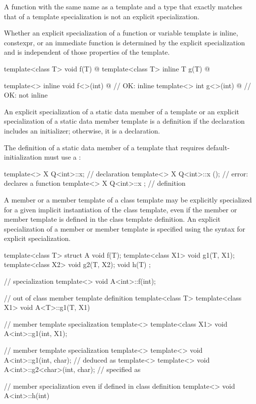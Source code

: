 \pnum
A function with the same name as a template and a type that exactly matches that
of a template specialization is not an explicit specialization.

\pnum
Whether an explicit specialization of a function or variable template
is inline, constexpr, or an immediate function
is determined by the explicit specialization and
is independent of those properties of the template.
\begin{example}
\begin{codeblock}
template<class T> void f(T) { @\commentellip@ }
template<class T> inline T g(T) { @\commentellip@ }

template<> inline void f<>(int) { @\commentellip@ }   // OK: inline
template<> int g<>(int) { @\commentellip@ }           // OK: not inline
\end{codeblock}
\end{example}

\pnum
An explicit specialization of a static data member of a template
or an explicit specialization of a static data member template is a
definition if the declaration includes an initializer;
otherwise, it is a declaration.
\begin{note}
The definition of a static data member of a template
that requires default-initialization must use a :

\begin{codeblock}
template<> X Q<int>::x;                         // declaration
template<> X Q<int>::x ();                      // error: declares a function
template<> X Q<int>::x { };                     // definition
\end{codeblock}
\end{note}

\pnum
A member or a member template of a class template may be explicitly specialized
for a given implicit instantiation of the class template, even if the member
or member template is defined in the class template definition.
An explicit specialization of a member or member template is specified using the
syntax for explicit specialization.
\begin{example}
\begin{codeblock}
template<class T> struct A {
  void f(T);
  template<class X1> void g1(T, X1);
  template<class X2> void g2(T, X2);
  void h(T) { }
};

// specialization
template<> void A<int>::f(int);

// out of class member template definition
template<class T> template<class X1> void A<T>::g1(T, X1) { }

// member template specialization
template<> template<class X1> void A<int>::g1(int, X1);

// member template specialization
template<> template<>
  void A<int>::g1(int, char);           //  deduced as 
template<> template<>
  void A<int>::g2<char>(int, char);     //  specified as 

// member specialization even if defined in class definition
template<> void A<int>::h(int) { }
\end{codeblock}
\end{example}

